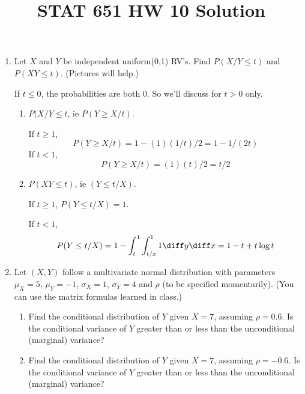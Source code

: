 \documentclass[12pt]{article}
\begin{document}
\title{STAT 651 HW 10 Solution}
\maketitle


\begin{enumerate}
\item Let $X$ and $Y$ be independent uniform(0,1) RV's. Find
$P(X/Y\le t)$ and $P(XY\le t)$. (Pictures will help.)

\hrulefill

If $t \le 0$, the probabilities are both 0.
So we'll discuss for $t > 0$ only.
\begin{enumerate}
\item $P(X/Y \le t$, ie $P(Y \ge X/t)$.

If $t \ge 1$,
\[
P(Y \ge X/t)
= 1 - (1)(1/t)/2 = 1 - 1/(2t)
\]
If $t < 1$,
\[
P(Y \ge X/t)
= (1)(t)/2
= t/2
\]

\item $P(XY \le t)$, ie $(Y \le t/X)$.

If $t \ge 1$, $P(Y \le t/X) = 1$.

If $t < 1$,
\[
P(Y \le t/X)
= 1 - \int_t^1\int_{t/x}^1 1 \diff y \diff x
= 1 - t + t\log t
\]

\end{enumerate}

\item Let $(X,Y)$ follow a multivariate normal distribution with parameters
$\mu_X = 5$, $\mu_Y = -1$, $\sigma_X = 1$, $\sigma_Y=4$ and $\rho$ (to be specified momentarily).
(You can use the matrix formulas learned in class.)

  \begin{enumerate}
  \item Find the conditional distribution of $Y$ given $X=7$, assuming $\rho = 0.6$.
  Is the conditional variance of $Y$ greater than or less than the unconditional (marginal) variance?
  \item Find the conditional distribution of $Y$ given $X=7$, assuming $\rho = -0.6$.
  Is the conditional variance of $Y$ greater than or less than the unconditional (marginal) variance?
  \end{enumerate}

\hrulefill


\end{enumerate}
\end{document}
